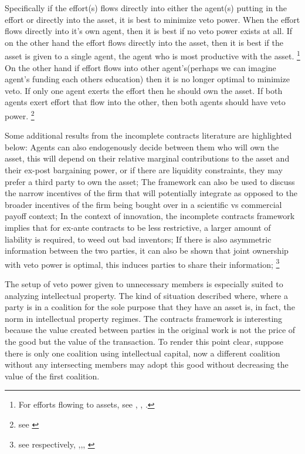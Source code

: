 \documentclass[12pt]{article}
\numberwithin{equation}{section}
\begin{document}
Specifically if the effort(s) flows directly into either the agent(s) putting in the effort or directly into the asset, it is best to minimize veto power. When the effort flows directly into it's own agent, then it is best if no veto power exists at all. If on the other hand the effort flows directly into the asset, then it is best if the asset is given to a single agent, the agent who is most productive with the asset. \footnote{For efforts flowing to assets, see \cite{schmitz2013investments}, \citet{gattai2016investment}, \cite{schmitz2017incomplete}. } On the other hand if effort flows into other agent's(perhaps we can imagine agent's funding each others education) then it is no longer optimal to minimize veto. If only one agent exerts the effort then he should own the asset. If both agents exert effort that flow into the other, then both agents should have veto power. \footnote{see \cite{hamada2011incentive}}

Some additional results from the incomplete contracts literature are highlighted below: Agents can also endogenously decide between them who will own the asset, this will depend on their relative marginal contributions to the asset and their ex-post bargaining power, or if there are liquidity constraints, they may prefer a third party to own the asset; The framework can also be used to discuss the narrow incentives of the firm that will potentially integrate as opposed to the broader incentives of the firm being bought over in a scientific vs commercial payoff context; In the context of innovation, the incomplete contracts framework implies that for ex-ante contracts to be less restrictive, a larger amount of liability is required, to weed out bad inventors; If there is also asymmetric information between the two parties, it can also be shown that joint ownership with veto power is optimal, this induces parties to share their information; \footnote{see respectively, \cite{Aghion1994},\citep{lerner2010contractibility},\citep{anton1994expropriation}, \citep{Rosenkranz1999}}

The setup of veto power given to unnecessary members is especially suited to analyzing intellectual property. The kind of situation described where, where a party is in a coalition for the sole purpose that they have an asset is, in fact, the norm in intellectual property regimes. The contracts framework is interesting because the value created between parties in the original work is not the price of the good but the value of the transaction. To render this point clear, suppose there is only one coalition using intellectual capital, now a different coalition without any intersecting members may adopt this good without decreasing the value of the first coalition. 
\end{document}
